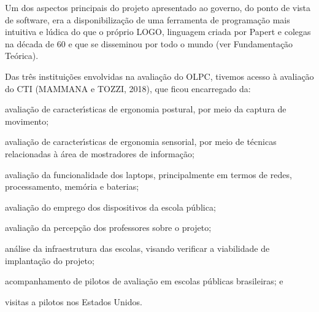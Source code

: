 \documentclass[
12pt,		%
openright,	%
twoside,  %
a4paper,			%
chapter=TITLE,		%
english,			%
french,				%
spanish,			%
brazil				%
]{USPSC-classe/USPSC}
\begin{document}
Um dos aspectos principais do projeto apresentado ao governo, do ponto de vista de software, era a disponibiliza\c{c}\~ao de uma ferramenta de programa\c{c}\~ao mais intuitiva e l\'udica do que o pr\'oprio LOGO, linguagem criada por Papert e colegas na d\'ecada de 60 e que se disseminou por todo o mundo (ver Fundamenta\c{c}\~ao Te\'orica).

















Das tr\^es institui\c{c}\~oes envolvidas na avalia\c{c}\~ao do OLPC, tivemos acesso \`a avalia\c{c}\~ao do CTI  (MAMMANA e TOZZI, 2018), que ficou encarregado da:


















\begin{alineas}
\item avalia\c{c}\~ao de caracter\'{\i}sticas de ergonomia postural, por meio da captura de movimento;
\item avalia\c{c}\~ao de caracter\'{\i}sticas de ergonomia sensorial, por meio de t\'ecnicas relacionadas \`a \'area de mostradores de informa\c{c}\~ao;
\item avalia\c{c}\~ao da funcionalidade dos \textquotedbl laptops\textquotedbl , principalmente em termos de redes, processamento, mem\'oria e baterias;
\item avalia\c{c}\~ao do emprego dos dispositivos  da escola p\'ublica;
\item avalia\c{c}\~ao da percep\c{c}\~ao dos professores sobre o projeto;
\item an\'alise da infraestrutura das escolas, visando verificar a viabilidade de implanta\c{c}\~ao do projeto;
\item acompanhamento de pilotos de avalia\c{c}\~ao em escolas p\'ublicas brasileiras; e
\item visitas a pilotos nos Estados Unidos.
\end{alineas}
\end{document}
